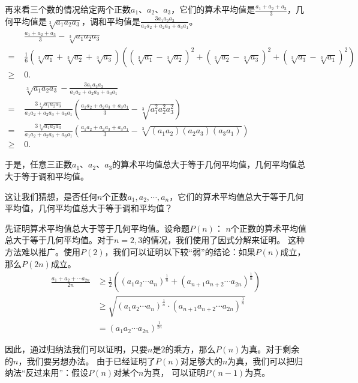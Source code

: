 \documentclass[12pt,UTF8]{ctexbook}
\begin{document}
再来看三个数的情况给定两个正数$a_1$、$a_2$、$a_3$，它们的算术平均值是$\frac{a_1 + a_2 + a_3}{3}$，几何平均值是$\sqrt[3]{a_1a_2a_3}$，调和平均值是$\frac{3a_1 a_2 a_3}{a_1 a_2 + a_2 a_3 + a_3 a_1}$。
\begin{align*}
    &\frac{a_1 + a_2 + a_3}{3} - \sqrt[3]{a_1a_2a_3}  \\
    =\,\,& \frac{1}{6}(\sqrt[3]{a_1} + \sqrt[3]{a_2} + \sqrt[3]{a_3})\left((\sqrt[3]{a_1} - \sqrt[3]{a_2})^2 + (\sqrt[3]{a_2} - \sqrt[3]{a_3})^2 + (\sqrt[3]{a_3} - \sqrt[3]{a_1})^2\right)  \\
    \geqslant\,\,&0.  \\
    &\sqrt[3]{a_1a_2a_3} - \frac{3a_1 a_2 a_3}{a_1 a_2 + a_2 a_3 + a_3 a_1}  \\
    =\,\,& \frac{3\sqrt[3]{a_1a_2a_3}}{a_1 a_2 + a_2 a_3 + a_3 a_1}\left(\frac{a_1 a_2 + a_2 a_3 + a_3 a_1}{3} - \sqrt[3]{a_1^2a_2^2a_3^2}\right)  \\
    =\,\,& \frac{3\sqrt[3]{a_1a_2a_3}}{a_1 a_2 + a_2 a_3 + a_3 a_1}\left(\frac{a_1 a_2 + a_2 a_3 + a_3 a_1}{3} - \sqrt[3]{(a_1a_2)(a_2a_3)(a_3a_1)}\right)  \\
    \geqslant \,\,&0. 
\end{align*}

于是，任意三正数$a_1$、$a_2$、$a_3$的算术平均值总大于等于几何平均值，几何平均值总大于等于调和平均值。

这让我们猜想，是否任何$n$个正数$a_1, a_2, \cdots , a_n$，它们的算术平均值总大于等于几何平均值，几何平均值总大于等于调和平均值？

先证明算术平均值总大于等于几何平均值。设命题$P(n)$：
$n$个正数的算术平均值总大于等于几何平均值。对于$n=2,3$的情况，我们使用了因式分解来证明。
这种方法难以推广。使用$P(2)$，我们可以证明以下较“弱”的结论：如果$P(n)$成立，那么$P(2n)$成立。
\begin{align*}
    \frac{a_1 + a_2 + \cdots a_{2n}}{2n} &\geqslant \frac{1}{2}\left((a_1a_2\cdots a_{n})^{\frac{1}{n}} + (a_{n+1}a_{n+2}\cdots a_{2n})^{\frac{1}{n}} \right)  \\
    &\geqslant \sqrt{(a_1a_2\cdots a_{n})^{\frac{1}{n}} \cdot (a_{n+1}a_{n+2}\cdots a_{2n})^{\frac{1}{n}}}  \\
    &= (a_1a_2\cdots a_{2n})^{\frac{1}{2n}}
\end{align*}

因此，通过归纳法我们可以证明，只要$n$是$2$的乘方，那么$P(n)$为真。对于剩余的$n$，我们要另想办法。
由于已经证明了$P(n)$对足够大的$n$为真，我们可以把归纳法“反过来用”：假设$P(n)$对某个$n$为真，
可以证明$P(n-1)$为真。
\end{document}
